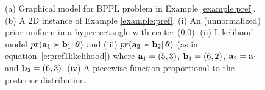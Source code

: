 \begin{figure}
\caption{\footnotesize 
(a) Graphical model for BPPL problem in Example \ref{example:pref}.
(b) A 2D instance of Example \ref{example:pref}: 
(i) An (unnormalized) prior uniform in a hyperrectangle with center (0,0).
(ii) Likelihood model $pr(\textbf{a}_1 \succ \textbf{b}_1 | \, \boldsymbol\theta)$ and
(iii) $pr(\textbf{a}_2 \succ \textbf{b}_2 | \, \boldsymbol\theta)$ 
(as in equation~\ref{e:pref1likelihood}) where
$\textbf{a}_1 = (5, 3)$, $\textbf{b}_1 = (6, 2)$, $\textbf{a}_2 = \textbf{a}_1$ and $\textbf{b}_2 = (6, 3)$.
(iv) A piecewise function proportional to the posterior distribution.}
\label{fig:pref-up-down}
\end{figure}

